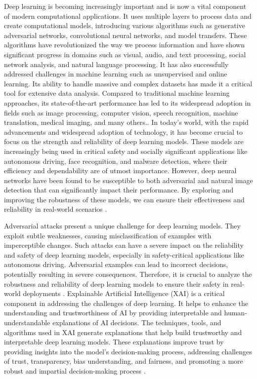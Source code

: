 \documentclass[10pt, conference, a4paper, final]{IEEEtran}
\begin{document}
Deep learning is becoming increasingly important and is now a vital component of modern computational applications. It uses multiple layers to process data and create computational models, introducing various algorithms such as generative adversarial networks, convolutional neural networks, and model transfers. These algorithms have revolutionized the way we process information and have shown significant progress in domains such as visual, audio, and text processing, social network analysis, and natural language processing. It has also successfully addressed challenges in machine learning such as unsupervised and online learning. Its ability to handle massive and complex datasets has made it a critical tool for extensive data analysis. Compared to traditional machine learning approaches, its state-of-the-art performance has led to its widespread adoption in fields such as image processing, computer vision, speech recognition, machine translation, medical imaging, and many others.\cite {Saad, Md}. In today's world, with the rapid advancements and widespread adoption of technology, it has become crucial to focus on the strength and reliability of deep learning models. These models are increasingly being used in critical safety and socially significant applications like autonomous driving, face recognition, and malware detection, where their efficiency and dependability are of utmost importance. However, deep neural networks have been found to be susceptible to both adversarial and natural image detection that can significantly impact their performance. By exploring and improving the robustness of these models, we can ensure their effectiveness and reliability in real-world scenarios \cite {Numair, Aleksandar}.

Adversarial attacks present a unique challenge for deep learning models. They exploit subtle weaknesses, causing misclassification of examples with imperceptible changes. Such attacks can have a severe impact on the reliability and safety of deep learning models, especially in safety-critical applications like autonomous driving. Adversarial examples can lead to incorrect decisions, potentially resulting in severe consequences. Therefore, it is crucial to analyze the robustness and reliability of deep learning models to ensure their safety in real-world deployments \cite {Samuel, Muhammad}. 
Explainable Artificial Intelligence (XAI) is a critical component in addressing the challenges of deep learning. It helps to enhance the understanding and trustworthiness of AI by providing interpretable and human-understandable explanations of AI decisions. The techniques, tools, and algorithms used in XAI generate explanations that help build trustworthy and interpretable deep learning models. These explanations improve trust by providing insights into the model's decision-making process, addressing challenges of trust, transparency, bias understanding, and fairness, and promoting a more robust and impartial decision-making process \cite {Mohammed, Aha, Tamer}. 
\end{document}
